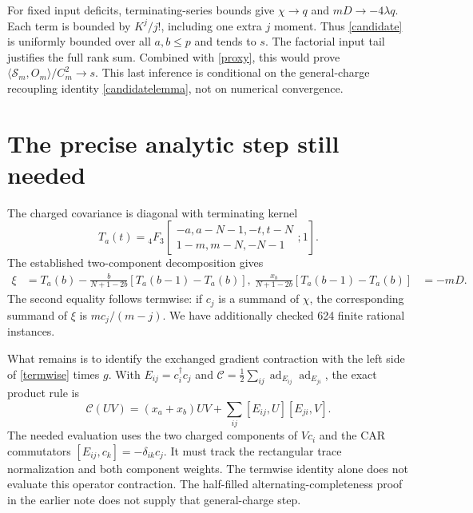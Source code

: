 \documentclass[11pt,a4paper]{article}
\begin{document}
For fixed input deficits, terminating-series bounds give
$\chi\to q$ and $mD\to-4\lambda q$. Each term is bounded by
$K^j/j!$, including one extra $j$ moment. Thus \eqref{candidate}
is uniformly bounded over all $a,b\le p$ and tends to $s$.
The factorial input tail justifies the full rank sum. Combined
with \eqref{proxy}, this would prove
$\langle\mathcal S_m,O_m\rangle/C_m^2\to s$.
This last inference is conditional on the general-charge
recoupling identity \eqref{candidatelemma}, not on numerical convergence.

\newpage
\section{The precise analytic step still needed}
The charged covariance is diagonal with terminating kernel
\begin{equation}
 T_a(t)={}_4F_3\!\left[\begin{matrix}-a,a-N-1,-t,t-N\\
 1-m,m-N,-N-1\end{matrix};1\right].
\end{equation}
The established two-component decomposition gives
\begin{align}
 \xi&=T_a(b)-\frac b{N+1-2b}[T_a(b-1)-T_a(b)],\
 \frac{x_b}{N+1-2b}[T_a(b-1)-T_a(b)]&=-mD.\label{termwise}
\end{align}
The second equality follows termwise: if $c_j$ is a summand of
$\chi$, the corresponding summand of $\xi$ is $mc_j/(m-j)$.
We have additionally checked 624 finite rational instances.

What remains is to identify the exchanged gradient contraction
with the left side of \eqref{termwise} times $g$. With
$E_{ij}=c_i^\dagger c_j$ and
$\mathcal C=\frac12\sum_{ij}\operatorname{ad}_{E_{ij}}
\operatorname{ad}_{E_{ji}}$, the exact product rule is
\begin{equation}
 \mathcal C(UV)=(x_a+x_b)UV+
          \sum_{ij}[E_{ij},U][E_{ji},V].
\end{equation}
The needed evaluation uses the two charged components of $Vc_i$
and the CAR commutators $[E_{ij},c_k]=-\delta_{ik}c_j$.
It must track the rectangular trace normalization and both
component weights. The termwise identity alone does not evaluate
this operator contraction. The half-filled alternating-completeness
proof in the earlier note does not supply that general-charge step.
\end{document}
